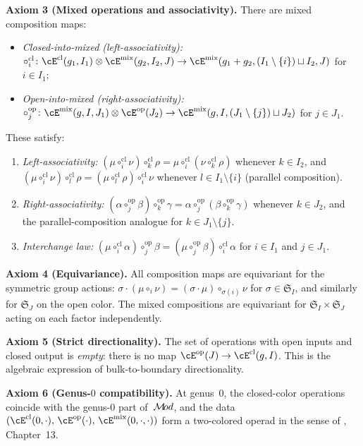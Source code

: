 \begin{definition}
\smallskip\noindent
\textbf{Axiom 3 (Mixed operations and associativity).}
There are mixed composition maps:
\begin{itemize}
\item \emph{Closed-into-mixed (left-associativity):}
 $\circ_i^{\mathrm{cl}} \colon
 \cE^{\mathrm{cl}}(g_1, I_1)
 \otimes \cE^{\mathrm{mix}}(g_2, I_2, J)
 \to \cE^{\mathrm{mix}}(g_1 + g_2,
 (I_1 \setminus \{i\}) \sqcup I_2, J)$
 for $i \in I_1$;
\item \emph{Open-into-mixed (right-associativity):}
 $\circ_j^{\mathrm{op}} \colon
 \cE^{\mathrm{mix}}(g, I, J_1)
 \otimes \cE^{\mathrm{op}}(J_2)
 \to \cE^{\mathrm{mix}}(g, I,
 (J_1 \setminus \{j\}) \sqcup J_2)$
 for $j \in J_1$.
\end{itemize}
These satisfy:
\begin{enumerate}[label=\textup{(A\arabic*)}]
\item \emph{Left-associativity:}
 $(\mu \circ_i^{\mathrm{cl}} \nu) \circ_k^{\mathrm{cl}} \rho
 = \mu \circ_i^{\mathrm{cl}}
 (\nu \circ_k^{\mathrm{cl}} \rho)$
 whenever $k \in I_2$, and
 $(\mu \circ_i^{\mathrm{cl}} \nu) \circ_l^{\mathrm{cl}} \rho
 = (\mu \circ_l^{\mathrm{cl}} \rho) \circ_i^{\mathrm{cl}} \nu$
 whenever $l \in I_1 \setminus \{i\}$ (parallel composition).
\item \emph{Right-associativity:}
 $(\alpha \circ_j^{\mathrm{op}} \beta)
 \circ_k^{\mathrm{op}} \gamma
 = \alpha \circ_j^{\mathrm{op}}
 (\beta \circ_k^{\mathrm{op}} \gamma)$
 whenever $k \in J_2$, and the parallel-composition analogue
 for $k \in J_1 \setminus \{j\}$.
\item \emph{Interchange law:}
 $(\mu \circ_i^{\mathrm{cl}} \alpha)
 \circ_j^{\mathrm{op}} \beta
 = (\mu \circ_j^{\mathrm{op}} \beta)
 \circ_i^{\mathrm{cl}} \alpha$
 for $i \in I_1$ and $j \in J_1$.
\end{enumerate}

\smallskip\noindent
\textbf{Axiom 4 (Equivariance).}
All composition maps are equivariant for the symmetric group
actions: $\sigma \cdot (\mu \circ_i \nu) =
(\sigma \cdot \mu) \circ_{\sigma(i)} \nu$ for
$\sigma \in \mathfrak{S}_I$, and similarly for
$\mathfrak{S}_J$ on the open color. The mixed compositions
are equivariant for $\mathfrak{S}_I \times \mathfrak{S}_J$
acting on each factor independently.

\smallskip\noindent
\textbf{Axiom 5 (Strict directionality).}
The set of operations with open inputs and closed output is
\emph{empty}: there is no map
$\cE^{\mathrm{op}}(J) \to \cE^{\mathrm{cl}}(g, I)$.
This is the algebraic expression of bulk-to-boundary
directionality.

\smallskip\noindent
\textbf{Axiom 6 (Genus-$0$ compatibility).}
At genus~$0$, the closed-color operations coincide with the
genus-$0$ part of~$\mathcal{M}\!od$, and the data
$(\cE^{\mathrm{cl}}(0,\cdot),\,
\cE^{\mathrm{op}}(\cdot),\,
\cE^{\mathrm{mix}}(0,\cdot,\cdot))$
form a two-colored operad in the sense of
\cite{LV12}, Chapter~13.
\end{definition}

